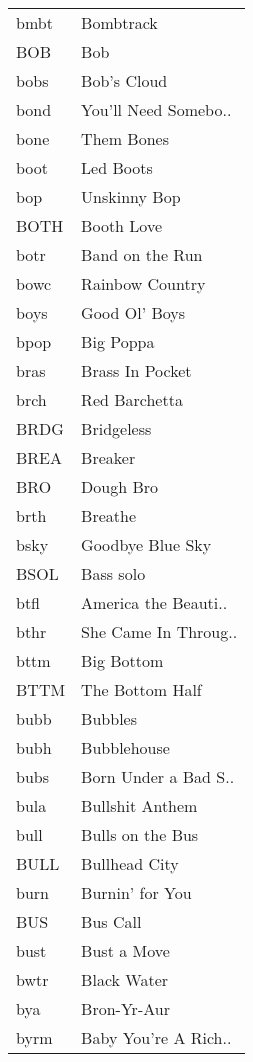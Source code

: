 \begin{supertabular}{ll}
 bmbt &             Bombtrack \\
  BOB &                   Bob \\
 bobs &           Bob's Cloud \\
 bond &  You'll Need Somebo.. \\
 bone &            Them Bones \\
 boot &             Led Boots \\
  bop &          Unskinny Bop \\
 BOTH &            Booth Love \\
 botr &       Band on the Run \\
 bowc &       Rainbow Country \\
 boys &         Good Ol' Boys \\
 bpop &             Big Poppa \\
 bras &       Brass In Pocket \\
 brch &         Red Barchetta \\
 BRDG &            Bridgeless \\
 BREA &               Breaker \\
  BRO &             Dough Bro \\
 brth &               Breathe \\
 bsky &      Goodbye Blue Sky \\
 BSOL &             Bass solo \\
 btfl &  America the Beauti.. \\
 bthr &  She Came In Throug.. \\
 bttm &            Big Bottom \\
 BTTM &       The Bottom Half \\
 bubb &               Bubbles \\
 bubh &           Bubblehouse \\
 bubs &  Born Under a Bad S.. \\
 bula &       Bullshit Anthem \\
 bull &      Bulls on the Bus \\
 BULL &         Bullhead City \\
 burn &       Burnin' for You \\
  BUS &              Bus Call \\
 bust &           Bust a Move \\
 bwtr &           Black Water \\
  bya &           Bron-Yr-Aur \\
 byrm &  Baby You're A Rich.. \\

\end{supertabular}

